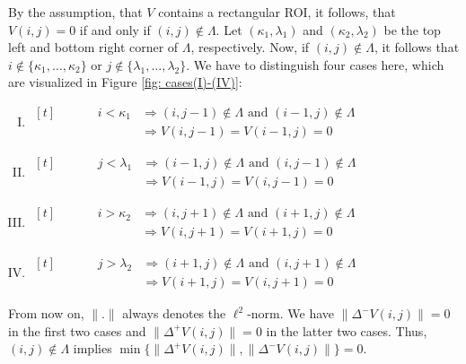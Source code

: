 \documentclass[a4paper,12pt]{article}
\newcommand{\norm}[1]{\lVert#1\rVert}
\theoremstyle{plain}
\theoremstyle{definition}
\numberwithin{equation}{section}
\begin{document}
By the assumption, that $V$ contains a rectangular ROI, it follows, that $V(i, j) = 0$ if and only if $(i, j) \notin \varLambda$. Let $(\kappa_1, \lambda_1)$ and $(\kappa_2, \lambda_2)$ be the top left and bottom right corner of $\varLambda$, respectively. Now, if $(i, j) \notin \varLambda$, it follows that $i \notin \{ \kappa_1, \dots, \kappa_2 \}$ or $j \notin \{ \lambda_1, \dots, \lambda_2 \}$. We have to distinguish four cases here, which are visualized in Figure \ref{fig: cases(I)-(IV)}:
\begin{enumerate}[(I)]
	\item $\begin{aligned}[t]
		\hspace{40pt} i < \kappa_1 &\Rightarrow (i, j - 1) \notin \varLambda \textrm{ and } (i - 1, j) \notin \varLambda \\
		&\Rightarrow V(i, j - 1) = V(i - 1, j) = 0
	\end{aligned}$
	\item $\begin{aligned}[t]
		\hspace{40pt} j < \lambda_1 &\Rightarrow (i - 1, j) \notin \varLambda \textrm{ and } (i, j - 1) \notin \varLambda \\
		&\Rightarrow V(i - 1, j) = V(i, j - 1) = 0
	\end{aligned}$
	\item $\begin{aligned}[t]
		\hspace{40pt} i > \kappa_2 &\Rightarrow (i, j + 1) \notin \varLambda \textrm{ and } (i + 1, j) \notin \varLambda \\
		&\Rightarrow V(i, j + 1) = V(i + 1, j) = 0
	\end{aligned}$
	\item $\begin{aligned}[t]
		\hspace{40pt} j > \lambda_2 &\Rightarrow (i + 1, j) \notin \varLambda \textrm{ and } (i, j + 1) \notin \varLambda \\
		&\Rightarrow V(i + 1, j) = V(i, j + 1) = 0
	\end{aligned}$
\end{enumerate}



From now on, $\norm{.}$ always denotes the $\ell^2$-norm. We have $\norm{\Delta^- V(i, j)} = 0$ in the first two cases and $\norm{\Delta^+ V(i, j)} = 0$ in the latter two cases. Thus, $(i, j) \notin \varLambda$ implies $\min \{ \norm{\Delta^+ V(i, j)}, \norm{\Delta^- V(i, j)} \} = 0$.
\end{document}
